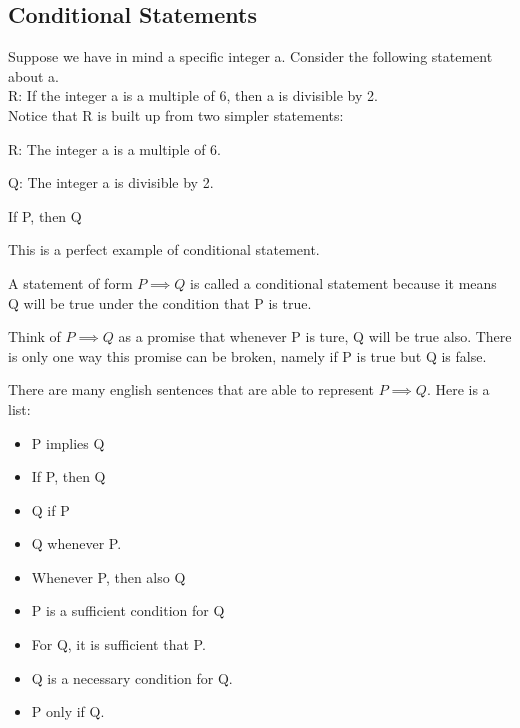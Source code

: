 \subsection{Conditional Statements}
Suppose we have in mind a specific integer a. 
Consider the following statement about a.\\

R: If the integer a is a multiple of 6, then a is divisible by 2. \\

Notice that R is built up from two simpler statements:
\begin{center}
    R: The integer a is a multiple of 6.

    Q: The integer a is divisible by 2. 

    If P, then Q
\end{center}

This is a perfect example of conditional statement. 

\begin{definition}
    A statement of form $P \implies Q$ is called a conditional statement because it means Q will be true under the condition that P is true. 
\end{definition}

Think of $P \implies Q$ as a promise that whenever P is ture, Q will be true also.
There is only one way this promise can be broken,
namely if P is true but Q is false. 

There are many english sentences that are able to represent $P \implies Q$. Here is a list:
\begin{itemize}
    \item P implies Q 
    \item If P, then Q 
    \item Q if P 
    \item Q whenever P. 
    \item Whenever P, then also Q 
    \item P is a sufficient condition for Q 
    \item For Q, it is sufficient that P. 
    \item Q is a necessary condition for Q.
    \item P only if Q. 
\end{itemize}
\newpage
